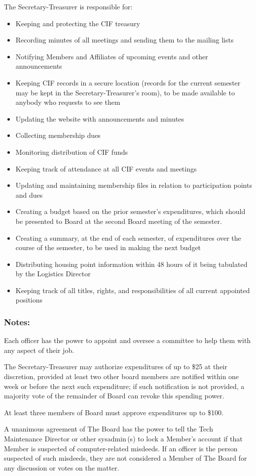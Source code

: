 The Secretary-Treasurer is responsible for:
\begin{itemize}
	\item Keeping and protecting the CIF treasury
	\item Recording minutes of all meetings and sending them to the mailing lists
	\item Notifying Members and Affiliates of upcoming events and other announcements
	\item Keeping CIF records in a secure location (records for the current semester may be kept in the Secretary-Treasurer's room), to be made available to anybody who requests to see them
	\item Updating the website with announcements and minutes
	\item Collecting membership dues
	\item Monitoring distribution of CIF funds
	\item Keeping track of attendance at all CIF events and meetings
	\item Updating and maintaining membership files in relation to participation points and dues
	\item Creating a budget based on the prior semester's expenditures, which should be presented to Board at the second Board meeting of the semester.
	\item Creating a summary, at the end of each semester, of expenditures over the course of the semester, to be used in making the next budget
	\item Distributing housing point information within 48 hours of it being tabulated by the Logistics Director
	\item Keeping track of all titles, rights, and responsibilities of all current appointed positions
\end{itemize}



		\subsubsection{Notes:}

Each officer has the power to appoint and oversee a committee to help them with any aspect of their job.

The Secretary-Treasurer may authorize expenditures of up to \$25 at their discretion, provided at least two other board members are notified within one week or before the next such expenditure; if such notification is not provided, a majority vote of the remainder of Board can revoke this spending power.

At least three members of Board must approve expenditures up to \$100.

A unanimous agreement of The Board has the power to tell the Tech Maintenance Director or other sysadmin\,(s) to lock a Member's account if that Member is suspected of computer-related misdeeds. If an officer is the person suspected of such misdeeds, they are not considered a Member of The Board for any discussion or votes on the matter.
